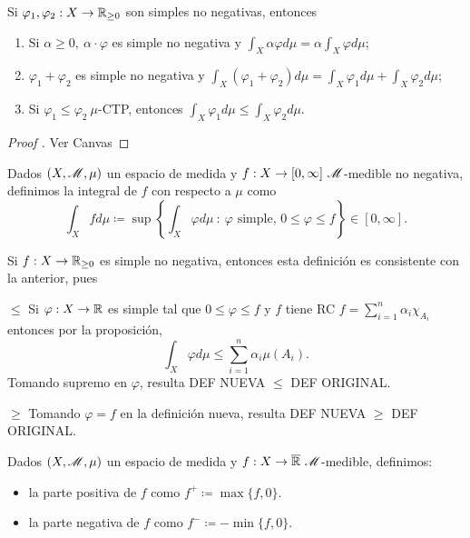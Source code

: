 \begin{prop}
	Si $\varphi_{1}, \varphi_{2} : X \to \mathbb{R}_{\geq 0}$ son simples no negativas, entonces
	\begin{enumerate}
		\item Si $\alpha \geq 0,\ \alpha \cdot \varphi$ es simple no negativa y $\int_{X} \alpha \varphi d\mu = \alpha \int_{X} \varphi d\mu$;

		\item $\varphi_{1} + \varphi_{2}$ es simple no negativa y $\int_{X} (\varphi_{1} + \varphi_{2}) d\mu = \int_{X} \varphi_{1} d\mu + \int_{X} \varphi_{2} d\mu$;

		\item Si $\varphi_{1} \leq \varphi_{2} \ \mu$-CTP, entonces $\int_{X} \varphi_{1} d\mu \leq \int_{X} \varphi_{2} d\mu$.
	\end{enumerate}
\end{prop}
\begin{proof}[Proof ]
	Ver Canvas
\end{proof}

\begin{definition}
	Dados $(X, \mathscr{M}, \mu)$ un espacio de medida y $f : X \to [0,\infty] \ \mscr{M}$-medible no negativa, definimos la integral de $f$ con respecto a $\mu$ como
	\[ \int_{X} f d\mu \coloneq \sup \left\{\int_{X} \varphi d\mu \ : \ \varphi \text{ simple, } 0 \leq \varphi \leq f\right\} \in [0,\infty]. \]
\end{definition}

\begin{remark}
	Si $f : X \to \mathbb{R}_{\geq 0}$ es simple no negativa, entonces esta definición es consistente con la anterior, pues \par
	\smallskip
	$\boxed{\leq}$ Si $\varphi : X \to \mathbb{R}$ es simple tal que $0 \leq \varphi \leq f$ y $f$ tiene RC $f = \sum_{i=1}^{n} \alpha_{i} \chi_{A_{i}}$ entonces por la proposición,
	\[ \int_{X} \varphi d\mu \leq \sum_{i=1}^{n} \alpha_{i} \mu(A_{i}). \]
	Tomando supremo en $\varphi$, resulta DEF NUEVA $\leq$ DEF ORIGINAL. \par
	\smallskip
	$\boxed{\geq}$ Tomando $\varphi = f$ en la definición nueva, resulta DEF NUEVA $\geq$ DEF ORIGINAL.
\end{remark}

\begin{definition}
	Dados $(X, \mathscr{M}, \mu)$ un espacio de medida y $f : X \to \overline{\R} \ \mscr{M}$-medible, definimos:
	\begin{itemize}
		\item la parte positiva de $f$ como $f^{+} \coloneq \max \{f,0\}$.

		\item la parte negativa de $f$ como $f^{-} \coloneq -\min \{f,0\}$.
	\end{itemize}
\end{definition}

